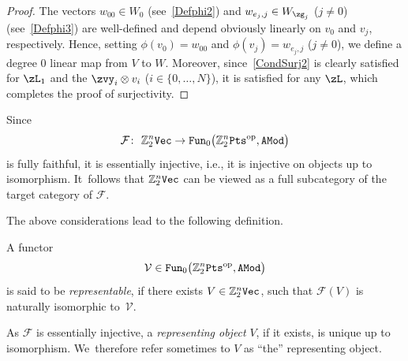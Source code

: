 \documentclass[pdftex]{sigma}%
\newcommand{\op}[1]{\operatorname{#1}}
\newcommand{\catname}[1]{\textnormal{\texttt{#1}}}
\newcommand{\Z}{{\mathbb Z}}
\def\cF{\mathcal{F}}
\newcommand{\0}{\otimes}
\numberwithin{equation}{section}
\begin{document}
\begin{proof}
The vectors $w_{00}\in W_{0}$ (see~\eqref{Defphi2}) and $w_{e_j,j}\in W_{\zg_j}$ ($j\neq 0$) (see~\eqref{Defphi3}) are well-defined and depend obviously linearly on $v_0$ and $v_j$, respectively. Hence, setting $\phi(v_0)=w_{00}$ and $\phi(v_j)=w_{e_j,j}$ ($j\neq 0$), we define a degree 0 linear map from $V$ to $W$. Moreover, since~\eqref{CondSurj2} is clearly satisfied for $\zL_1$ and the $\zvy_i\0 v_i$ ($i\in\{0,\dots,N\}$), it is satisfied for any $\zL$, which completes the proof of surjectivity.
\end{proof}

Since
\[
\cF\colon\ \Z_2^n{\tt Vec}\to {\tt Fun}_0\big(\Z_2^n{\tt Pts}^{\op{op}},\tt AMod\big)
\]
is fully faithful, it is essentially injective, i.e., it is injective on objects up to isomorphism. It~follows that $\Z_2^n{\tt Vec}$ can be viewed as a full subcategory of the target category of $\cF$.

%
The above considerations lead to the following definition.
%
\begin{Definition}%
A functor
%
\[
\mathcal{V}\in{\tt Fun}_0\big(\Z_2^n\catname{Pts}^\textnormal{op}, \catname{AMod}\big)
\]
%
is said to be \emph{representable}, if there exists $V\in\Z_2^n\tt Vec$, such that $\cF(V)$ is naturally isomorphic to~$\mathcal{V}$.
\end{Definition}

As $\cF$ is essentially injective, a {\it representing object} $V$, if it exists, is unique up to isomorphism. We~therefore refer sometimes to $V$ as ``the'' representing object.

%
\end{document}
